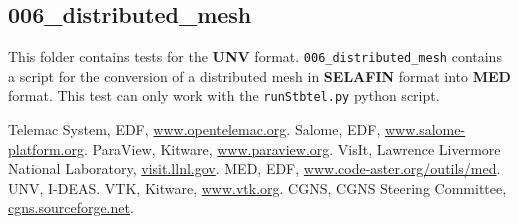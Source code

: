 \documentclass[a4paper,10pt]{article}
\newcommand{\slf}{\textbf{SELAFIN}\xspace}
\newcommand{\unv}{\textbf{UNV}\xspace}
\newcommand{\med}{\textbf{MED}\xspace}
\begin{document}
\subsection{006\_distributed\_mesh}

This folder contains tests for the \unv format.
\verb+006_distributed_mesh+ contains a script for the conversion of a distributed mesh
in \slf format into \med format. This test can only work with the \verb+runStbtel.py+ python script.

\begin{thebibliography}{9}
  Telemac System,
  EDF,
  \url{www.opentelemac.org}.
  Salome,
  EDF,
  \url{www.salome-platform.org}.
  ParaView,
  Kitware,
  \url{www.paraview.org}.
  VisIt,
  Lawrence Livermore National Laboratory,
  \url{visit.llnl.gov}.
  MED,
  EDF,
  \url{www.code-aster.org/outils/med}.
  UNV,
  I-DEAS.
  VTK,
  Kitware,
  \url{www.vtk.org}.
  CGNS,
  CGNS Steering Committee,
  \url{cgns.sourceforge.net}.
\end{thebibliography}
\end{document}
